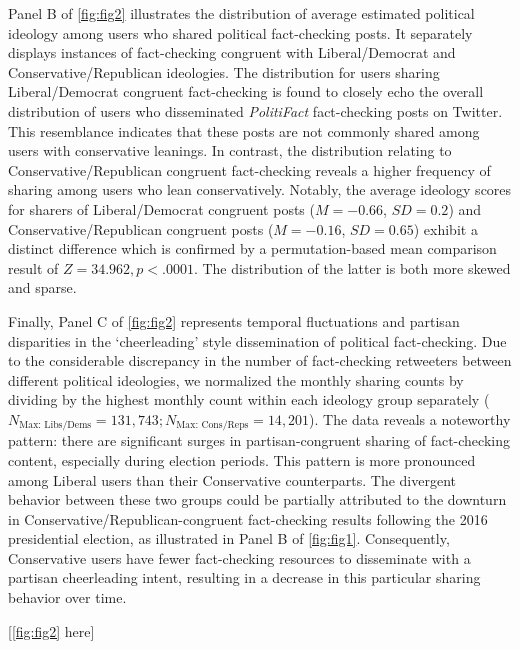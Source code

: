 \documentclass[
  12pt,
]{article}
\begin{document}
Panel B of \autoref{fig:fig2} illustrates the distribution of average
estimated political ideology among users who shared political
fact-checking posts. It separately displays instances of fact-checking
congruent with Liberal/Democrat and Conservative/Republican ideologies.
The distribution for users sharing Liberal/Democrat congruent
fact-checking is found to closely echo the overall distribution of users
who disseminated \emph{PolitiFact} fact-checking posts on Twitter. This
resemblance indicates that these posts are not commonly shared among
users with conservative leanings. In contrast, the distribution relating
to Conservative/Republican congruent fact-checking reveals a higher
frequency of sharing among users who lean conservatively. Notably, the
average ideology scores for sharers of Liberal/Democrat congruent posts
(\(M = -0.66\), \(SD = 0.2\)) and Conservative/Republican congruent
posts (\(M = -0.16\), \(SD = 0.65\)) exhibit a distinct difference which
is confirmed by a permutation-based mean comparison result of
\(Z = 34.962, p< .0001\). The distribution of the latter is both more
skewed and sparse.

Finally, Panel C of \autoref{fig:fig2} represents temporal fluctuations
and partisan disparities in the `cheerleading' style dissemination of
political fact-checking. Due to the considerable discrepancy in the
number of fact-checking retweeters between different political
ideologies, we normalized the monthly sharing counts by dividing by the
highest monthly count within each ideology group separately
(\(N_{\text{Max: Libs/Dems}} = 131,743; N_{\text{Max: Cons/Reps}} = 14,201\)).
The data reveals a noteworthy pattern: there are significant surges in
partisan-congruent sharing of fact-checking content, especially during
election periods. This pattern is more pronounced among Liberal users
than their Conservative counterparts. The divergent behavior between
these two groups could be partially attributed to the downturn in
Conservative/Republican-congruent fact-checking results following the
2016 presidential election, as illustrated in Panel B of
\autoref{fig:fig1}. Consequently, Conservative users have fewer
fact-checking resources to disseminate with a partisan cheerleading
intent, resulting in a decrease in this particular sharing behavior over
time.

\begin{center}
[\autoref{fig:fig2} here]
\end{center}
\end{document}
